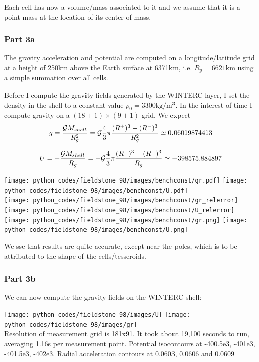 Each cell has now a volume/mass associated to it and we assume that it is 
a point mass at the location of its center of mass. 

\subsubsection*{Part 3a}

The gravity acceleration and potential are computed on a longitude/latitude 
grid at a height of 250km above the Earth surface at 6371km, i.e. $R_g=6621\si{\kilo\metre}$ using a 
simple summation over all cells.

Before I compute the gravity fields generated by the WINTERC layer, 
I set the density in the shell to a constant value $\rho_0=3300\si{\kilo\gram\per\cubic\metre}$.
In the interest of time I compute gravity on a $(18+1)\times(9+1)$ grid.
We expect 
\[
g=\frac{{\cal G} M_{shell}}{R_g^2}= 
{\cal G} \frac{4}{3}\pi \frac{(R^+)^3-(R^-)^3}{R_g^2}
\simeq 0.06019874413
\]

\[
U=-\frac{{\cal G} M_{shell}}{R_g}
=- {\cal G} \frac{4}{3}\pi \frac{(R^+)^3-(R^-)^3}{R_g}
\simeq -398575.884897
\]

\begin{center}
\texttt{[image: python\_codes/fieldstone\_98/images/benchconst/gr.pdf]}
\texttt{[image: python\_codes/fieldstone\_98/images/benchconst/U.pdf]}\\
\texttt{[image: python\_codes/fieldstone\_98/images/benchconst/gr\_relerror]}
\texttt{[image: python\_codes/fieldstone\_98/images/benchconst/U\_relerror]}\\
\texttt{[image: python\_codes/fieldstone\_98/images/benchconst/gr.png]}
\texttt{[image: python\_codes/fieldstone\_98/images/benchconst/U.png]}
\end{center}

We sse that results are quite accurate, except near the poles, which is to 
be attributed to the shape of the cells/tesseroids. 

\subsubsection*{Part 3b}
 
We can now compute the gravity fields on the WINTERC shell:

\begin{center}
\texttt{[image: python\_codes/fieldstone\_98/images/U]}
\texttt{[image: python\_codes/fieldstone\_98/images/gr]}\\
{\captionfont Resolution of measurement grid is 181x91. It took 
about 19,100 seconds to run, averaging 1.16s per measurement point.  
Potential isocontours at -400.5e3, -401e3, -401.5e3, -402e3. 
Radial acceleration contours at 0.0603, 0.0606 and 0.0609}
\end{center}

